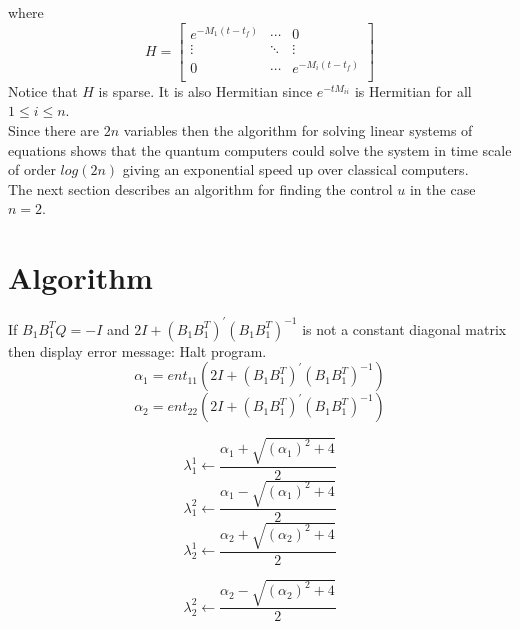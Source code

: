 \documentclass[12pt]{article}
\begin{document}
where
\begin{equation}
H=    \begin{bmatrix}
e^{-M_1(t-t_f)}&\cdots& 0\\
\vdots& \ddots & \vdots\\
0&\cdots & e^{-M_i(t-t_f)}\\ 
 \end{bmatrix}
\end{equation}
Notice that $H$ is  sparse. It is also Hermitian  since $e^{-tM_{ii}}$ is Hermitian for all $1\leq i\leq n$.\\
Since there are $2n$ variables  then the  algorithm for solving linear systems of equations shows that the quantum computers  could solve the system in time scale of order $log(2n)$ giving an exponential speed up over classical computers.\\
The next section describes   an algorithm for finding the control $u$ in the case $n=2$.
\section{Algorithm}
If $B_1B_1^TQ=-I$   and $2I+(B_1B_1^T)^{'}(B_1B_1^T)^{-1}$  is not a constant diagonal matrix then display error message: Halt program.
$$\alpha_{1}=ent_{11}(2I+(B_1B_1^T)^{'}(B_1B_1^T)^{-1})$$
$$\alpha_{2}=ent_{22}(2I+(B_1B_1^T)^{'}(B_1B_1^T)^{-1})$$

$$\lambda_{1}^1\leftarrow \frac{\alpha_{1}+\sqrt{(\alpha_{1})^2+4}}{2}$$
$$\lambda_{1}^2\leftarrow \frac{\alpha_{1}-\sqrt{(\alpha_{1})^2+4}}{2}$$
$$\lambda_{2}^1\leftarrow \frac{\alpha_{2}+\sqrt{(\alpha_{2})^2+4}}{2}$$

$$\lambda_{2}^2\leftarrow \frac{\alpha_{2}-\sqrt{(\alpha_{2})^2+4}}{2}$$


  
\end{document}

